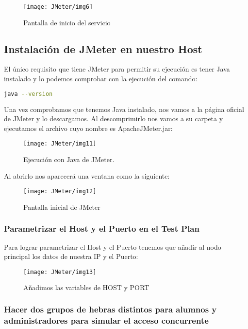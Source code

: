 \begin{figure}[H]
    \centering
    \texttt{[image: JMeter/img6]}
    \caption{Pantalla de inicio del servicio}
\end{figure}

\subsection{Instalación de JMeter en nuestro Host}

El único requisito que tiene JMeter para permitir su ejecución es tener Java instalado y lo podemos comprobar con la ejecución del comando:

\begin{lstlisting}[language=bash]
    java --version
\end{lstlisting}

Una vez comprobamos que tenemos Java instalado, nos vamos a la página oficial de JMeter y lo descargamos. Al descomprimirlo nos vamos a su carpeta y ejecutamos el archivo cuyo nombre es ApacheJMeter.jar:

\begin{figure}[H]
    \centering
    \texttt{[image: JMeter/img11]}
    \caption{Ejecución con Java de JMeter.}
\end{figure}

Al abrirlo nos aparecerá una ventana como la siguiente:

\begin{figure}[H]
    \centering
    \texttt{[image: JMeter/img12]}
    \caption{Pantalla inicial de JMeter}
\end{figure}

\subsubsection{Parametrizar el Host y el Puerto en el Test Plan}

Para lograr parametrizar el Host y el Puerto tenemos que añadir al nodo principal los datos de nuestra IP y el Puerto:

\begin{figure}[H]
    \centering
    \texttt{[image: JMeter/img13]}
    \caption{Añadimos las variables de HOST y PORT}
\end{figure}

\newpage
\subsubsection{Hacer dos grupos de hebras distintos para alumnos y administradores para simular el acceso concurrente}

